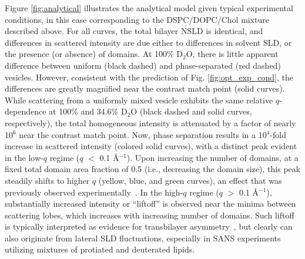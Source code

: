 \documentclass[8.5pt,twoside,twocolumn]{article}
\begin{document}
Figure \ref{fig:analytical} illustrates the analytical model given typical experimental conditions, in this case corresponding to the DSPC/DOPC/Chol mixture described above. For all curves, the total bilayer NSLD is identical, and differences in scattered intensity are due either to differences in solvent SLD, or the presence (or absence) of domains. At 100\% D$_2$O, there is little apparent difference between uniform (black dashed) and phase-separated (red dashed) vesicles. However, consistent with the prediction of Fig. \ref{fig:opt_exp_cond}, the differences are greatly magnified near the contrast match point (solid curves). While scattering from a uniformly mixed vesicle exhibits the same relative $q$-dependence at 100\% and 34.6\% D$_2$O (black dashed and solid curves, respectively), the total homogeneous intensity is attenuated by a factor of nearly 10$^6$ near the contrast match point. Now, phase separation results in a 10$^4$-fold increase in scattered intensity (colored solid curves), with a distinct peak evident in the low-$q$ regime ($q$ $<$ 0.1 \AA$^{-1}$). Upon increasing the number of domains, at a fixed total domain area fraction of 0.5 (i.e., decreasing the domain size), this peak steadily shifts to higher $q$ (yellow, blue, and green curves), an effect that was previously observed experimentally~\cite{Heberle.2013,Heberle.2013b}. In the high-$q$ regime ($q$ $>$ 0.1 \AA$^{-1}$), substantially increased intensity or ``liftoff'' is observed near the minima between scattering lobes, which increases with increasing number of domains. Such liftoff is typically interpreted as evidence for transbilayer asymmetry~\cite{Kucerka.2007,Brzustowicz.2005}, but clearly can also originate from lateral SLD fluctuations, especially in SANS experiments utilizing mixtures of protiated and deuterated lipids.
\end{document}
